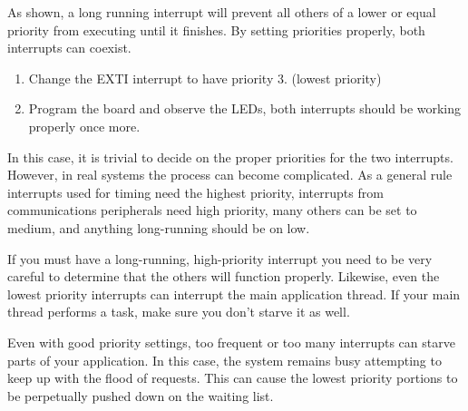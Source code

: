 \documentclass[11pt,fleqn]{book} %
\begin{document}
\begin{exercise}
    As shown, a long running interrupt will prevent all others of a lower or equal priority from executing until it finishes. By setting priorities properly, both interrupts can coexist. 
    
    \begin{enumerate}
        \item Change the EXTI interrupt to have priority 3. (lowest priority)
        \item Program the board and observe the LEDs, both interrupts should be working properly once more.
    \end{enumerate}
    
    In this case, it is trivial to decide on the proper priorities for the two interrupts. However, in real systems the process can become complicated. As a general rule interrupts used for timing need the highest priority, interrupts from communications peripherals need high priority, many others can be set to medium, and anything long-running should be on low. 
    
    If you must have a long-running, high-priority interrupt you need to be very careful to determine that the others will function properly. Likewise, even the lowest priority interrupts can interrupt the main application thread. If your main thread performs a task, make sure you don't starve it as well. 
    
    Even with good priority settings, too frequent or too many interrupts can starve parts of your application. In this case, the system remains busy attempting to keep up with the flood of requests. This can cause the lowest priority portions to be perpetually pushed down on the waiting list.
    
\end{exercise}

\end{document}
